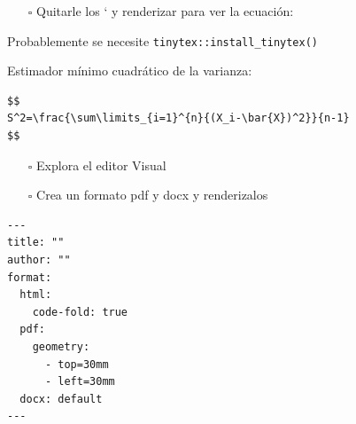 \documentclass[
  letterpaper,
  DIV=11,
  numbers=noendperiod]{scrartcl}
\providecommand{\tightlist}{%
  \setlength{\itemsep}{0pt}\setlength{\parskip}{0pt}}\usepackage{longtable,booktabs,array}
\begin{document}
\begin{itemize}
\tightlist
\item[$\square$]
  Quitarle los ` y renderizar para ver la ecuación:
\end{itemize}

\begin{tcolorbox}[enhanced jigsaw, colbacktitle=quarto-callout-note-color!10!white, opacitybacktitle=0.6, bottomrule=.15mm, colframe=quarto-callout-note-color-frame, opacityback=0, toptitle=1mm, breakable, toprule=.15mm, left=2mm, bottomtitle=1mm, leftrule=.75mm, arc=.35mm, title=\textcolor{quarto-callout-note-color}{\faInfo}\hspace{0.5em}{Note}, titlerule=0mm, rightrule=.15mm, coltitle=black, colback=white]

Probablemente se necesite \texttt{tinytex::install\_tinytex()}

\end{tcolorbox}

Estimador mínimo cuadrático de la varianza:

\begin{verbatim}
$$
S^2=\frac{\sum\limits_{i=1}^{n}{(X_i-\bar{X})^2}}{n-1}
$$
\end{verbatim}

\begin{itemize}
\item[$\square$]
  Explora el editor Visual
\item[$\square$]
  Crea un formato pdf y docx y renderizalos
\end{itemize}

\begin{verbatim}
---
title: ""
author: ""
format:
  html: 
    code-fold: true
  pdf:
    geometry: 
      - top=30mm
      - left=30mm
  docx: default
---
\end{verbatim}
\end{document}
